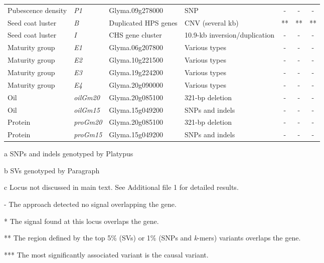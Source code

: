 \documentclass[doublespacing]{bmcart}
\begin{document}
\begin{backmatter}
\begin{table}[p]
\begin{threeparttable}
\begin{tabular}{llllccc}
		Pubescence density\tnote{c} & \textit{P1} & Glyma.09g278000 & SNP \citep{liu2020ps} & - & - & - \\
		Seed coat luster & \textit{B} & Duplicated HPS genes & CNV (several kb) \citep{gijzen2006} & ** & ** & ** \\
		Seed coat luster\tnote{c} & \textit{I} & CHS gene cluster & 10.9-kb inversion/duplication \citep{tuteja2008} & - & - & - \\
		Maturity group\tnote{c} & \textit{E1} & Glyma.06g207800 & Various types \citep{tardivel2019} & - & - & - \\
		Maturity group\tnote{c} & \textit{E2} & Glyma.10g221500 & Various types \citep{tardivel2019} & - & - & - \\
		Maturity group\tnote{c} & \textit{E3} & Glyma.19g224200 & Various types \citep{tardivel2019} & - & - & - \\
		Maturity group\tnote{c} & \textit{E4} & Glyma.20g090000 & Various types \citep{tardivel2019} & - & - & - \\
		Oil\tnote{c} & \textit{oilGm20} & Glyma.20g085100 & 321-bp deletion \citep{fliege2022} & - & - & - \\
		Oil\tnote{c} & \textit{oilGm15} & Glyma.15g049200 & SNPs and indels \citep{zhang2020} & - & - & - \\
		Protein\tnote{c} & \textit{proGm20} & Glyma.20g085100 & 321-bp deletion \citep{fliege2022} & - & - & - \\
		Protein\tnote{c} & \textit{proGm15} & Glyma.15g049200 & SNPs and indels \citep{zhang2020} & - & - & - \\
		\bottomrule
		\end{tabular}

		\begin{tablenotes}
		\item[a] SNPs and indels genotyped by Platypus
		\item[b] SVs genotyped by Paragraph
		\item[c] Locus not discussed in main text. See Additional file 1 for detailed results.
		\item[]- The approach detected no signal overlapping the gene.
		\item[]* The signal found at this locus overlaps the gene.
		\item[]** The region defined by the top 5\% (SVs) or 1\% (SNPs and \textit{k}-mers) variants overlaps the gene.
		\item[]*** The most significantly associated variant is the causal variant.
		\end{tablenotes}

	\end{threeparttable}
\end{table}



\end{backmatter}
\end{document}
